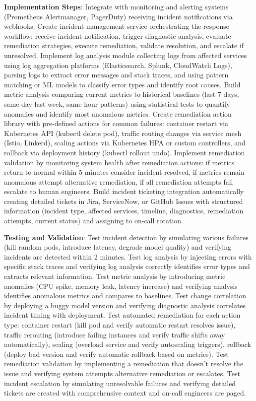 \textbf{Implementation Steps}: Integrate with monitoring and alerting systems (Prometheus Alertmanager, PagerDuty) receiving incident notifications via webhooks. Create incident management service orchestrating the response workflow: receive incident notification, trigger diagnostic analysis, evaluate remediation strategies, execute remediation, validate resolution, and escalate if unresolved. Implement log analysis module collecting logs from affected services using log aggregation platforms (Elasticsearch, Splunk, CloudWatch Logs), parsing logs to extract error messages and stack traces, and using pattern matching or ML models to classify error types and identify root causes. Build metric analysis comparing current metrics to historical baselines (last 7 days, same day last week, same hour patterns) using statistical tests to quantify anomalies and identify most anomalous metrics. Create remediation action library with pre-defined actions for common failures: container restart via Kubernetes API (kubectl delete pod), traffic routing changes via service mesh (Istio, Linkerd), scaling actions via Kubernetes HPA or custom controllers, and rollback via deployment history (kubectl rollout undo). Implement remediation validation by monitoring system health after remediation actions: if metrics return to normal within 5 minutes consider incident resolved, if metrics remain anomalous attempt alternative remediation, if all remediation attempts fail escalate to human engineers. Build incident ticketing integration automatically creating detailed tickets in Jira, ServiceNow, or GitHub Issues with structured information (incident type, affected services, timeline, diagnostics, remediation attempts, current status) and assigning to on-call rotation.

\textbf{Testing and Validation}: Test incident detection by simulating various failures (kill random pods, introduce latency, degrade model quality) and verifying incidents are detected within 2 minutes. Test log analysis by injecting errors with specific stack traces and verifying log analysis correctly identifies error types and extracts relevant information. Test metric analysis by introducing metric anomalies (CPU spike, memory leak, latency increase) and verifying analysis identifies anomalous metrics and compares to baselines. Test change correlation by deploying a buggy model version and verifying diagnostic analysis correlates incident timing with deployment. Test automated remediation for each action type: container restart (kill pod and verify automatic restart resolves issue), traffic rerouting (introduce failing instances and verify traffic shifts away automatically), scaling (overload service and verify autoscaling triggers), rollback (deploy bad version and verify automatic rollback based on metrics). Test remediation validation by implementing a remediation that doesn't resolve the issue and verifying system attempts alternative remediation or escalates. Test incident escalation by simulating unresolvable failures and verifying detailed tickets are created with comprehensive context and on-call engineers are paged.

